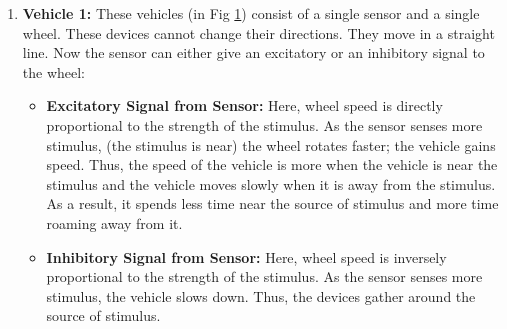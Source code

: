 \documentclass[main.tex]{subfiles}
\begin{document}
    \begin{enumerate}



        \begin{figure}[t]%
            \centering
            \qquad
            \caption{Braitenberg Vehicle Model 1}%
            \label{fig:vehicle1}%
        \end{figure}

        \item \textbf{Vehicle 1:} These vehicles (in Fig \ref{fig:vehicle1}) consist of a single sensor and a single wheel. These devices cannot change their directions. They move in a straight line. Now the sensor can either give an excitatory or an inhibitory signal to the wheel:

        \begin{itemize}
            \item \textbf{Excitatory Signal from Sensor:} Here, wheel speed is directly proportional to the strength of the stimulus. As the sensor senses more stimulus, (the stimulus is near) the wheel rotates faster; the vehicle gains speed. Thus, the speed of the vehicle is more when the vehicle is near the stimulus and the vehicle moves slowly when it is away from the stimulus. As a result, it spends less time near the source of stimulus and more time roaming away from it.
           \item \textbf{Inhibitory Signal from Sensor:} Here, wheel speed is inversely proportional to the strength of the stimulus. As the sensor senses more stimulus, the vehicle slows down. Thus, the devices gather around the source of stimulus.
        \end{itemize}





\end{enumerate}
\end{document}
